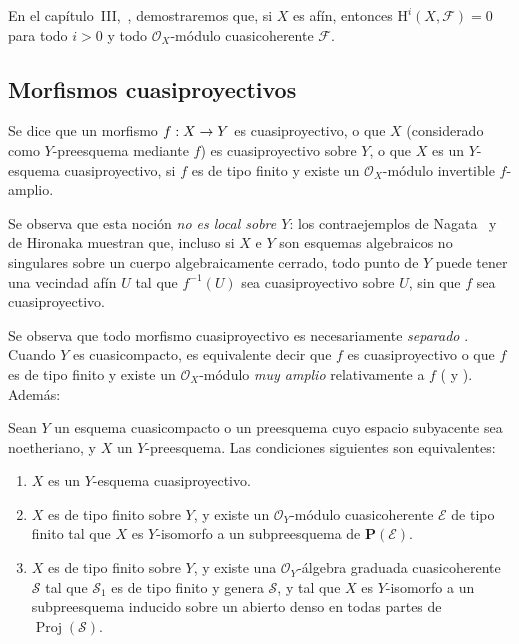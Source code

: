 \documentclass[oneside,10pt]{amsart}
\makeatletter
\newcommand{\ega@arrow}[2]{\mathchoice{#1}{#2}{#2}{#2}}
\renewcommand{\to}{\ega@arrow{\longrightarrow}{\rightarrow}}
\let\EGAOriginalLabel\label
\renewcommand{\label}[1]{\phantomsection\EGAOriginalLabel{#1}}
\makeatother
\begin{document}
\begin{remark}[5.2.4]
\label{II.5.2.4-fr}
En el capítulo~III,~, demostraremos que, si $X$ es afín, entonces $\mathrm{H}^i(X,\mathcal{F})=0$ para todo $i>0$ y todo $\mathcal{O}_X$-módulo cuasicoherente $\mathcal{F}$.
\end{remark}

\subsection{Morfismos cuasiproyectivos}
\label{subsection:II.5.3-fr}

\begin{definition}[5.3.1]
\label{II.5.3.1-fr}
Se dice que un morfismo $f:X\to Y$ es cuasiproyectivo, o que $X$ (considerado como $Y$-preesquema mediante $f$) es cuasiproyectivo sobre $Y$, o que $X$ es un $Y$-esquema cuasiproyectivo, si $f$ es de tipo finito y existe un $\mathcal{O}_X$-módulo invertible $f$-amplio.
\end{definition}

Se observa que esta noción \emph{no es local sobre $Y$}:
los contraejemplos de Nagata~\cite{II-26} y de Hironaka muestran que, incluso si $X$ e $Y$ son esquemas algebraicos no singulares sobre un cuerpo algebraicamente cerrado, todo punto de $Y$ puede tener una vecindad afín $U$ tal que $f^{-1}(U)$ sea cuasiproyectivo sobre $U$, sin que $f$ sea cuasiproyectivo.

Se observa que todo morfismo cuasiproyectivo es necesariamente \emph{separado} .
Cuando $Y$ es cuasicompacto, es equivalente decir que $f$ es cuasiproyectivo o que $f$ es de tipo finito y existe un $\mathcal{O}_X$-módulo \emph{muy amplio} relativamente a $f$ ( y ).
Además:

\begin{proposition}[5.3.2]
\label{II.5.3.2-fr}
Sean $Y$ un esquema cuasicompacto o un preesquema cuyo espacio subyacente sea noetheriano, y $X$ un $Y$-preesquema.
Las condiciones siguientes son equivalentes:
\begin{enumerate}
  \item[{\rm(a)}] $X$ es un $Y$-esquema cuasiproyectivo.
  \item[{\rm(b)}] $X$ es de tipo finito sobre $Y$, y existe un $\mathcal{O}_Y$-módulo cuasicoherente $\mathcal{E}$ de tipo finito tal que $X$ es $Y$-isomorfo a un subpreesquema de $\mathbf{P}(\mathcal{E})$.
  \item[{\rm(c)}] $X$ es de tipo finito sobre $Y$, y existe una $\mathcal{O}_Y$-álgebra graduada cuasicoherente $\mathcal{S}$ tal que $\mathcal{S}_1$ es de tipo finito y genera $\mathcal{S}$, y tal que $X$ es $Y$-isomorfo a un subpreesquema inducido sobre un abierto denso en todas partes de $\operatorname{Proj}(\mathcal{S})$.
\end{enumerate}
\end{proposition}
\end{document}
